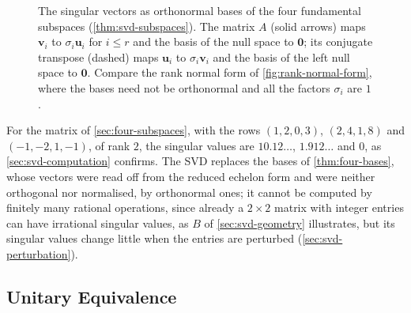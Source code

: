 \begin{figure}
{}{The singular vectors as orthonormal bases of the four fundamental subspaces (\cref{thm:svd-subspaces}). The matrix $A$ (solid arrows) maps $\mathbf v_i$ to $\sigma_i\mathbf u_i$ for $i\le r$ and the basis of the null space to $\mathbf 0$; its conjugate transpose (dashed) maps $\mathbf u_i$ to $\sigma_i\mathbf v_i$ and the basis of the left null space to $\mathbf 0$. Compare the rank normal form of \cref{fig:rank-normal-form}, where the bases need not be orthonormal and all the factors $\sigma_i$ are $1$.\label{fig:svd-subspaces}}
\end{figure}

For the matrix of \cref{sec:four-subspaces}, with the rows $(1,2,0,3)$, $(2,4,1,8)$ and $(-1,-2,1,-1)$, of rank $2$, the singular values are $10.12\ldots$, $1.912\ldots$ and $0$, as \cref{sec:svd-computation} confirms. The SVD replaces the bases of \cref{thm:four-bases}, whose vectors were read off from the reduced echelon form and were neither orthogonal nor normalised, by orthonormal ones; it cannot be computed by finitely many rational operations, since already a $2\times2$ matrix with integer entries can have irrational singular values, as $B$ of \cref{sec:svd-geometry} illustrates, but its singular values change little when the entries are perturbed (\cref{sec:svd-perturbation}).

\subsection{Unitary Equivalence}

